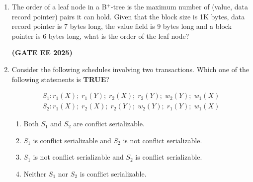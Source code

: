 \documentclass[journal,12pt,onecolumn]{IEEEtran}
\theoremstyle{remark}
\begin{document}
\begin {center}
\begin{enumerate}
\begin{enumerate}
\item Any relation with two attributes is in BCNF. 
\item A relation in which every key has only one attribute is in 2NF.
\item A prime attribute can be transitively dependent on a key in a 3NF relation. 
\item A prime attribute can be transitively dependent on a key in a BCNF relation.

\end{enumerate}

\hfill \textbf{(GATE EE 2025)}
\item The order of a leaf node in a B$^+$-tree is the maximum number of (value, data record pointer) pairs it can hold. Given that the block size is 1K bytes, data record pointer is 7 bytes long, the value field is 9 bytes long and a block pointer is 6 bytes long, what is the order of the leaf node?

\begin{enumerate}
\end{enumerate}
\hfill \textbf{(GATE EE 2025)}
\item Consider the following schedules involving two transactions. Which one of the following statements is \textbf{TRUE}?


\begin{align}
S_1: r_1(X); \; r_1(Y); \; r_2(X); \; r_2(Y); \; w_2(Y); \; w_1(X) \\
S_2: r_1(X); \; r_2(X); \; r_2(Y); \; w_2(Y); \; r_1(Y); \; w_1(X) 
 \end{align}
\begin{enumerate}
 \item Both $S_1$ and $S_2$ are conflict serializable. 
\item  $S_1$ is conflict serializable and $S_2$ is not conflict serializable. 
\item  $S_1$ is not conflict serializable and $S_2$ is conflict serializable. 
\item  Neither $S_1$ nor $S_2$ is conflict serializable.

\end{enumerate}


\end{enumerate}
\end{center}
\end{document}
